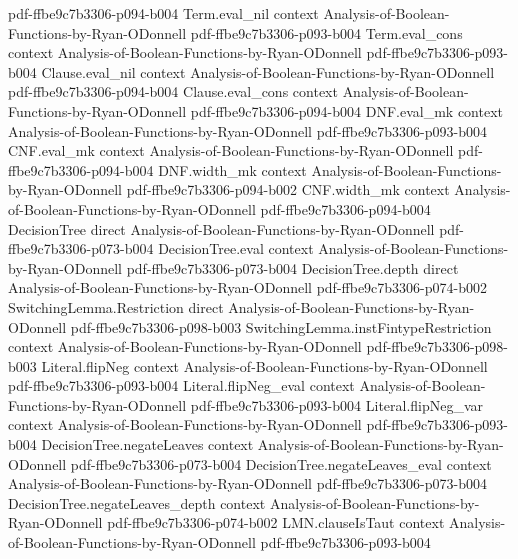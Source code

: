 \begin{lemma}
  {pdf-ffbe9c7b3306-p094-b004}
\proofstep
  {Term.eval_nil}
  {context}
  {Analysis-of-Boolean-Functions-by-Ryan-ODonnell}
  {pdf-ffbe9c7b3306-p093-b004}
\proofstep
  {Term.eval_cons}
  {context}
  {Analysis-of-Boolean-Functions-by-Ryan-ODonnell}
  {pdf-ffbe9c7b3306-p093-b004}
\proofstep
  {Clause.eval_nil}
  {context}
  {Analysis-of-Boolean-Functions-by-Ryan-ODonnell}
  {pdf-ffbe9c7b3306-p094-b004}
\proofstep
  {Clause.eval_cons}
  {context}
  {Analysis-of-Boolean-Functions-by-Ryan-ODonnell}
  {pdf-ffbe9c7b3306-p094-b004}
\proofstep
  {DNF.eval_mk}
  {context}
  {Analysis-of-Boolean-Functions-by-Ryan-ODonnell}
  {pdf-ffbe9c7b3306-p093-b004}
\proofstep
  {CNF.eval_mk}
  {context}
  {Analysis-of-Boolean-Functions-by-Ryan-ODonnell}
  {pdf-ffbe9c7b3306-p094-b004}
\proofstep
  {DNF.width_mk}
  {context}
  {Analysis-of-Boolean-Functions-by-Ryan-ODonnell}
  {pdf-ffbe9c7b3306-p094-b002}
\proofstep
  {CNF.width_mk}
  {context}
  {Analysis-of-Boolean-Functions-by-Ryan-ODonnell}
  {pdf-ffbe9c7b3306-p094-b004}
\proofstep
  {DecisionTree}
  {direct}
  {Analysis-of-Boolean-Functions-by-Ryan-ODonnell}
  {pdf-ffbe9c7b3306-p073-b004}
\proofstep
  {DecisionTree.eval}
  {context}
  {Analysis-of-Boolean-Functions-by-Ryan-ODonnell}
  {pdf-ffbe9c7b3306-p073-b004}
\proofstep
  {DecisionTree.depth}
  {direct}
  {Analysis-of-Boolean-Functions-by-Ryan-ODonnell}
  {pdf-ffbe9c7b3306-p074-b002}
\proofstep
  {SwitchingLemma.Restriction}
  {direct}
  {Analysis-of-Boolean-Functions-by-Ryan-ODonnell}
  {pdf-ffbe9c7b3306-p098-b003}
\proofstep
  {SwitchingLemma.instFintypeRestriction}
  {context}
  {Analysis-of-Boolean-Functions-by-Ryan-ODonnell}
  {pdf-ffbe9c7b3306-p098-b003}
\proofstep
  {Literal.flipNeg}
  {context}
  {Analysis-of-Boolean-Functions-by-Ryan-ODonnell}
  {pdf-ffbe9c7b3306-p093-b004}
\proofstep
  {Literal.flipNeg_eval}
  {context}
  {Analysis-of-Boolean-Functions-by-Ryan-ODonnell}
  {pdf-ffbe9c7b3306-p093-b004}
\proofstep
  {Literal.flipNeg_var}
  {context}
  {Analysis-of-Boolean-Functions-by-Ryan-ODonnell}
  {pdf-ffbe9c7b3306-p093-b004}
\proofstep
  {DecisionTree.negateLeaves}
  {context}
  {Analysis-of-Boolean-Functions-by-Ryan-ODonnell}
  {pdf-ffbe9c7b3306-p073-b004}
\proofstep
  {DecisionTree.negateLeaves_eval}
  {context}
  {Analysis-of-Boolean-Functions-by-Ryan-ODonnell}
  {pdf-ffbe9c7b3306-p073-b004}
\proofstep
  {DecisionTree.negateLeaves_depth}
  {context}
  {Analysis-of-Boolean-Functions-by-Ryan-ODonnell}
  {pdf-ffbe9c7b3306-p074-b002}
\proofstep
  {LMN.clauseIsTaut}
  {context}
  {Analysis-of-Boolean-Functions-by-Ryan-ODonnell}
  {pdf-ffbe9c7b3306-p093-b004}
\proofstep

\end{lemma}
